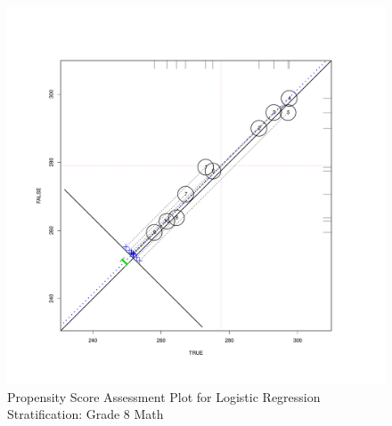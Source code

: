 \documentclass[letterpaper,12p,twoside]{article} %
\begin{document}
\begin{figure}[h!]
\begin{center}
\includegraphics[height=.4\textheight,width=.4\textheight]{../Figures2009/g8math-circpsa10.pdf}
\caption{Propensity Score Assessment Plot for Logistic Regression Stratification: Grade 8 Math}
\end{center}
\end{figure}


\end{document}
